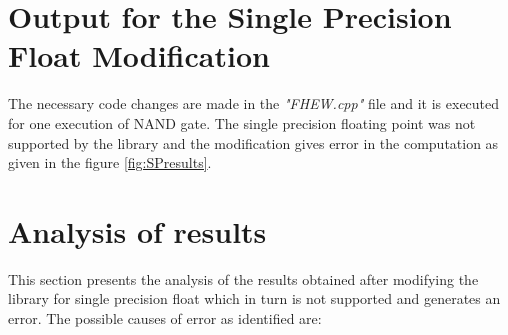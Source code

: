\section {Output for the Single Precision Float Modification}
The necessary code changes are made in the \textit{"FHEW.cpp"} file and it is executed for one execution of NAND gate. The single precision floating point was not supported by the library and the modification gives error in the computation as given in the figure \ref{fig:SPresults}.


\section{ Analysis of results}\label{3.10}
This section presents the analysis of the results obtained after modifying the library for single precision float which in turn is not supported and generates an error. The possible causes of error as identified are:
